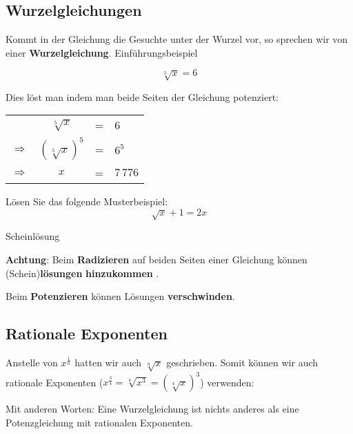 \newpage
\subsection{Wurzelgleichungen}
Kommt in der Gleichung die Gesuchte unter der Wurzel vor, so sprechen
wir von einer \textbf{Wurzelgleichung}. Einführungsbeispiel


$$\sqrt[5]{x}=6$$


Dies löst man indem man beide Seiten der Gleichung potenziert:

\begin{tabular}{rccl}
  \             & $\sqrt[5]{x}$   &=&     6      \\
  $\Rightarrow$ & $(\sqrt[5]x)^5$ &=&  $6^5$     \\
  $\Rightarrow$ & $x$             &=& $7\,776$ 
\end{tabular}


Lösen Sie das folgende Musterbeispiel:
$$\sqrt{x}+1=2x$$



\begin{bemerkung}{Scheinlösung}{}
  
\textbf{Achtung}: Beim \textbf{Radizieren} auf beiden Seiten
einer Gleichung können (Schein)\textbf{lösungen} \textbf{hinzukommen} .


Beim \textbf{Potenzieren} können Lösungen \textbf{verschwinden}.
\end{bemerkung}
\newpage



\subsection{Rationale Exponenten}

Anstelle von $x^{\frac{1}{n}}$ hatten wir auch $\sqrt[n]{x}$
geschrieben.
Somit können wir auch rationale Exponenten ($x^{\frac{3}{4}}  = \sqrt[4]{x^{3}} = (\sqrt[4]x)^3$) verwenden:

Mit anderen Worten: Eine Wurzelgleichung ist nichts anderes als eine
Potenzgleichung mit rationalen Exponenten.

